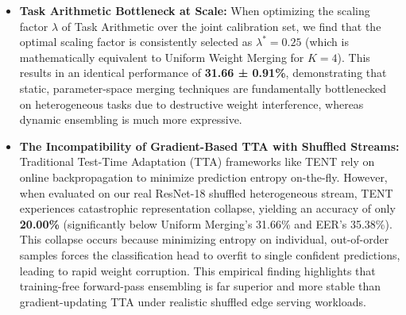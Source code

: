 \begin{itemize}
    We diagnose this failure and reveal a \emph{self-referential pseudo-label corruption loop} caused by the Entropy Calibration Discrepancy: during early online update steps, the overconfident MNIST expert claims out-of-distribution samples (such as CIFAR-10 and SVHN). This claims-bias corrupts the MNIST running centroid with SVHN and CIFAR-10 representations, collapsing the spatial gating boundaries and preventing SVHN/CIFAR-10 centroids from receiving their proper in-distribution activations. This highlights a fundamental theoretical limitation of pure unsupervised online adaptation under severe calibration discrepancy, justifying why a semi-supervised spatial anchor (as in CG-EER) or a soft-blending regularizer (as in EPL-OCA Soft) is necessary to break the corruption feedback loop.
    \item \textbf{Task Arithmetic Bottleneck at Scale:} When optimizing the scaling factor $\lambda$ of Task Arithmetic over the joint calibration set, we find that the optimal scaling factor is consistently selected as $\lambda^* = 0.25$ (which is mathematically equivalent to Uniform Weight Merging for $K=4$). This results in an identical performance of \textbf{31.66 ± 0.91\%}, demonstrating that static, parameter-space merging techniques are fundamentally bottlenecked on heterogeneous tasks due to destructive weight interference, whereas dynamic ensembling is much more expressive.
    \item \textbf{The Incompatibility of Gradient-Based TTA with Shuffled Streams:} Traditional Test-Time Adaptation (TTA) frameworks like TENT rely on online backpropagation to minimize prediction entropy on-the-fly. However, when evaluated on our real ResNet-18 shuffled heterogeneous stream, TENT experiences catastrophic representation collapse, yielding an accuracy of only \textbf{20.00\%} (significantly below Uniform Merging's 31.66\% and EER's 35.38\%). This collapse occurs because minimizing entropy on individual, out-of-order samples forces the classification head to overfit to single confident predictions, leading to rapid weight corruption. This empirical finding highlights that training-free forward-pass ensembling is far superior and more stable than gradient-updating TTA under realistic shuffled edge serving workloads.

\end{itemize}
